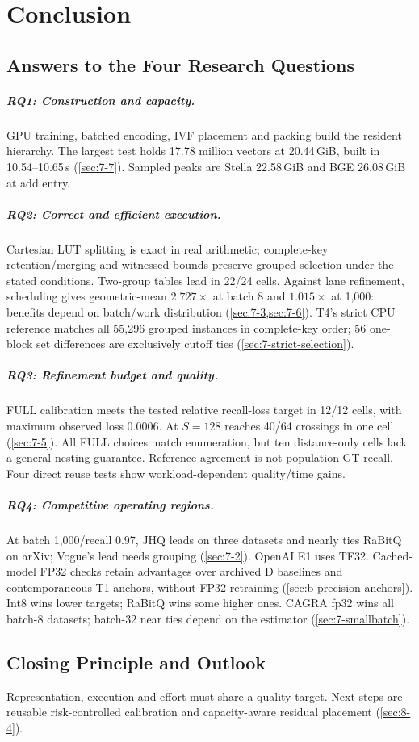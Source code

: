 \chapter{Conclusion}
\label{ch:conclusion}

\section{Answers to the Four Research Questions}
\label{sec:9-1}
\paragraph{RQ1: Construction and capacity.}
GPU training, batched encoding, IVF placement and packing build the resident hierarchy. The largest test holds 17.78 million vectors at 20.44\,GiB, built in 10.54--10.65\,s (\cref{sec:7-7}). Sampled peaks are Stella 22.58\,GiB and BGE 26.08\,GiB at add entry.

\paragraph{RQ2: Correct and efficient execution.}
Cartesian LUT splitting is exact in real arithmetic; complete-key retention/merging and witnessed bounds preserve grouped selection under the stated conditions. Two-group tables lead in 22/24 cells. Against lane refinement, scheduling gives geometric-mean $2.727\times$ at batch 8 and $1.015\times$ at 1,000: benefits depend on batch/work distribution (\cref{sec:7-3,sec:7-6}). T4's strict CPU
reference matches all 55,296 grouped instances in complete-key order;
56 one-block set differences are exclusively cutoff ties
(\cref{sec:7-strict-selection}).

\paragraph{RQ3: Refinement budget and quality.}
FULL calibration meets the tested relative
recall-loss target in 12/12 cells, with maximum observed loss 0.0006.
At $S=128$ reaches 40/64 crossings in one cell (\cref{sec:7-5}). All FULL choices match enumeration, but ten distance-only cells lack a general nesting guarantee. Reference agreement is not population GT recall. Four direct reuse tests show workload-dependent quality/time gains.

\paragraph{RQ4: Competitive operating regions.}
At batch 1,000/recall 0.97, JHQ leads on three datasets and nearly ties RaBitQ on arXiv; Vogue's lead needs grouping (\cref{sec:7-2}). OpenAI E1 uses TF32. Cached-model FP32 checks retain advantages over archived D baselines and contemporaneous T1 anchors, without FP32 retraining (\cref{sec:b-precision-anchors}). Int8 wins lower targets; RaBitQ wins some higher ones. CAGRA fp32 wins all batch-8 datasets; batch-32 near ties depend on the estimator (\cref{sec:7-smallbatch}).

\section{Closing Principle and Outlook}
\label{sec:9-2}
Representation, execution and effort must share a quality target. Next steps are reusable risk-controlled calibration and capacity-aware residual placement (\cref{sec:8-4}).